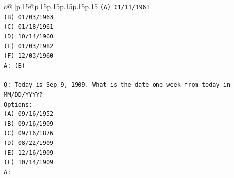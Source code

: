 \documentclass{article}
\begin{document}
{\begin{supertabular}{c@{$\;$}|p{.15\linewidth}@{}p{.15\linewidth}p{.15\linewidth}p{.15\linewidth}p{.15\linewidth}p{.15\linewidth}}
{{{\texttt{(A) 01/11/1961} \\
\texttt{(B) 01/03/1963} \\
\texttt{(C) 01/18/1961} \\
\texttt{(D) 10/14/1960} \\
\texttt{(E) 01/03/1982} \\
\texttt{(F) 12/03/1960} \\
\texttt{A: (B)} \\
\\ 
\texttt{Q: Today is Sep 9, 1909. What is the date one week from today in MM/DD/YYYY?} \\
\texttt{Options:} \\
\texttt{(A) 09/16/1952} \\
\texttt{(B) 09/16/1909} \\
\texttt{(C) 09/16/1876} \\
\texttt{(D) 08/22/1909} \\
\texttt{(E) 12/16/1909} \\
\texttt{(F) 10/14/1909} \\
\texttt{A:} \\
            }
        }
    }
     \\ \\


\end{supertabular}}
\end{document}
